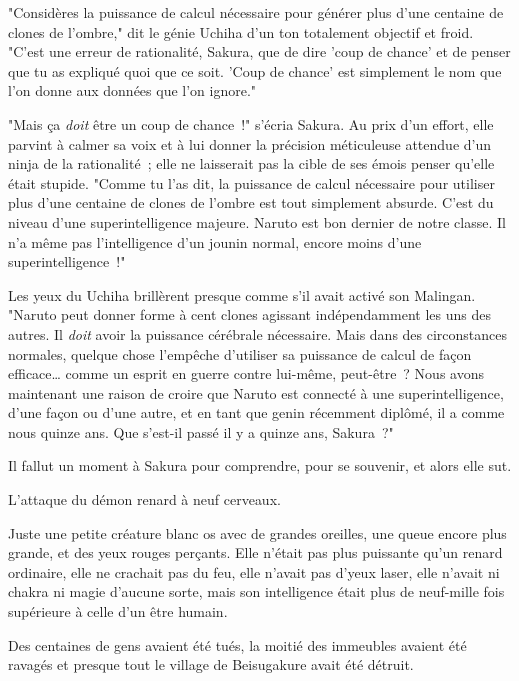 \clearpage
{}

"Considères la puissance de calcul nécessaire pour générer plus d'une centaine de clones de l'ombre," dit le génie Uchiha d'un ton totalement objectif et froid. "C'est une erreur de rationalité, Sakura, que de dire 'coup de chance' et de penser que tu as expliqué quoi que ce soit. 'Coup de chance' est simplement le nom que l'on donne aux données que l'on ignore."

"Mais ça \emph{doit} être un coup de chance~!" s'écria Sakura. Au prix d'un effort, elle parvint à calmer sa voix et à lui donner la précision méticuleuse attendue d'un ninja de la rationalité~; elle ne laisserait pas la cible de ses émois penser qu'elle était stupide. "Comme tu l'as dit, la puissance de calcul nécessaire pour utiliser plus d'une centaine de clones de l'ombre est tout simplement absurde. C'est du niveau d'une superintelligence majeure. Naruto est bon dernier de notre classe. Il n'a même pas l'intelligence d'un jounin normal, encore moins d'une superintelligence~!"

Les yeux du Uchiha brillèrent presque comme s'il avait activé son Malingan. "Naruto peut donner forme à cent clones agissant indépendamment les uns des autres. Il \emph{doit} avoir la puissance cérébrale nécessaire. Mais dans des circonstances normales, quelque chose l'empêche d'utiliser sa puissance de calcul de façon efficace… comme un esprit en guerre contre lui-même, peut-être~? Nous avons maintenant une raison de croire que Naruto est connecté à une superintelligence, d'une façon ou d'une autre, et en tant que genin récemment diplômé, il a comme nous quinze ans. Que s'est-il passé il y a quinze ans, Sakura~?"

Il fallut un moment à Sakura pour comprendre, pour se souvenir, et alors elle sut.

L'attaque du démon renard à neuf cerveaux.

Juste une petite créature blanc os avec de grandes oreilles, une queue encore plus grande, et des yeux rouges perçants. Elle n'était pas plus puissante qu'un renard ordinaire, elle ne crachait pas du feu, elle n'avait pas d'yeux laser, elle n'avait ni chakra ni magie d'aucune sorte, mais son intelligence était plus de neuf-mille fois supérieure à celle d'un être humain.

Des centaines de gens avaient été tués, la moitié des immeubles avaient été ravagés et presque tout le village de Beisugakure avait été détruit.

